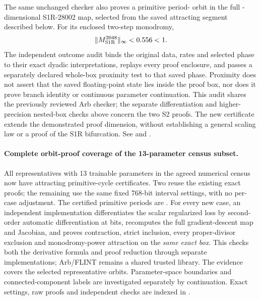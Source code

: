 \documentclass[11pt,letterpaper]{article}
\begin{document}
The same unchanged checker also proves a primitive period-\nSOneRCertPeriod{} orbit in the full
\nSOneRCertDimension{}-dimensional S1R-28002 map, selected from the saved attracting segment described below.
For its enclosed two-step monodromy,
\begin{equation}
\|M_{\mathrm{S1R}}^{2048}\|_\infty < 0.556 < 1.
\end{equation}
The independent outcome audit binds the original data, rates and selected phase to their exact dyadic
interpretations, replays every proof enclosure, and passes a separately declared whole-box proximity test
to that saved phase. Proximity does not assert that the saved floating-point state lies inside the proof box,
nor does it prove branch identity or continuous parameter continuation. This audit shares the previously
reviewed Arb checker; the separate differentiation and higher-precision nested-box checks above concern the
two S2 proofs. The new certificate extends the demonstrated proof dimension, without establishing a general
scaling law or a proof of the S1R bifurcation. See  and
.

\paragraph{Complete orbit-proof coverage of the 13-parameter census subset.}
All \nCensusThirteen{} representatives with 13 trainable parameters in the agreed numerical census
now have attracting primitive-cycle certificates. Two reuse the existing exact proofs; the remaining
\nCensusThirteenNew{} use the same fixed 768-bit interval settings, with no per-case adjustment.
The certified primitive periods are \tCensusThirteenPeriods{}.
For every new case, an independent implementation differentiates the scalar regularized loss by
second-order automatic differentiation at \nCensusThirteenPrecision{} bits, recomputes the full gradient-descent
map and Jacobian, and proves contraction, strict inclusion, every proper-divisor exclusion and
monodromy-power attraction on the \emph{same exact box}. This checks both the derivative formula
and proof reduction through separate implementations; Arb/FLINT remains a shared trusted library.
The evidence covers the selected representative orbits. Parameter-space boundaries and connected-component
labels are investigated separately by continuation. Exact settings, raw proofs and independent checks
are indexed in .
\end{document}
